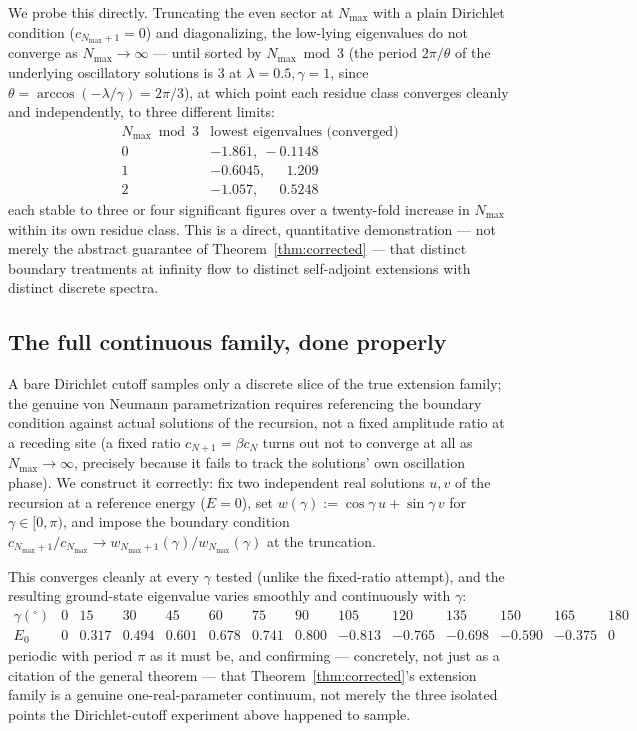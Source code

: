 \documentclass[11pt]{amsart}
\theoremstyle{remark}
\begin{document}
We probe this directly. Truncating the even sector at $N_{\max}$ with a plain Dirichlet condition ($c_{N_{\max}+1}=0$) and diagonalizing, the low-lying eigenvalues do not converge as $N_{\max}\to\infty$ --- until sorted by $N_{\max}\bmod3$ (the period $2\pi/\theta$ of the underlying oscillatory solutions is $3$ at $\lambda=0.5,\gamma=1$, since $\theta=\arccos(-\lambda/\gamma)=2\pi/3$), at which point each residue class converges cleanly and independently, to three different limits:
\[
\begin{array}{c|c}
N_{\max}\bmod3 & \text{lowest eigenvalues (converged)}\\\hline
0 & -1.861,\ -0.1148\\
1 & -0.6045,\ \phantom{-}1.209\\
2 & -1.057,\ \phantom{-}0.5248
\end{array}
\]
each stable to three or four significant figures over a twenty-fold increase in $N_{\max}$ within its own residue class. This is a direct, quantitative demonstration --- not merely the abstract guarantee of Theorem~\ref{thm:corrected} --- that distinct boundary treatments at infinity flow to distinct self-adjoint extensions with distinct discrete spectra.

\subsection{The full continuous family, done properly}
A bare Dirichlet cutoff samples only a discrete slice of the true extension family; the genuine von Neumann parametrization requires referencing the boundary condition against actual solutions of the recursion, not a fixed amplitude ratio at a receding site (a fixed ratio $c_{N+1}=\beta c_N$ turns out not to converge at all as $N_{\max}\to\infty$, precisely because it fails to track the solutions' own oscillation phase). We construct it correctly: fix two independent real solutions $u,v$ of the recursion at a reference energy ($E=0$), set $w(\gamma):=\cos\gamma\,u+\sin\gamma\,v$ for $\gamma\in[0,\pi)$, and impose the boundary condition $c_{N_{\max}+1}/c_{N_{\max}}\to w_{N_{\max}+1}(\gamma)/w_{N_{\max}}(\gamma)$ at the truncation.

This converges cleanly at every $\gamma$ tested (unlike the fixed-ratio attempt), and the resulting ground-state eigenvalue varies smoothly and continuously with $\gamma$:
\[
\begin{array}{c|cccccccccccccc}
\gamma(^\circ) & 0 & 15 & 30 & 45 & 60 & 75 & 90 & 105 & 120 & 135 & 150 & 165 & 180\\\hline
E_0 & 0 & 0.317 & 0.494 & 0.601 & 0.678 & 0.741 & 0.800 & -0.813 & -0.765 & -0.698 & -0.590 & -0.375 & 0
\end{array}
\]
periodic with period $\pi$ as it must be, and confirming --- concretely, not just as a citation of the general theorem --- that Theorem~\ref{thm:corrected}'s extension family is a genuine one-real-parameter continuum, not merely the three isolated points the Dirichlet-cutoff experiment above happened to sample.
\end{document}
